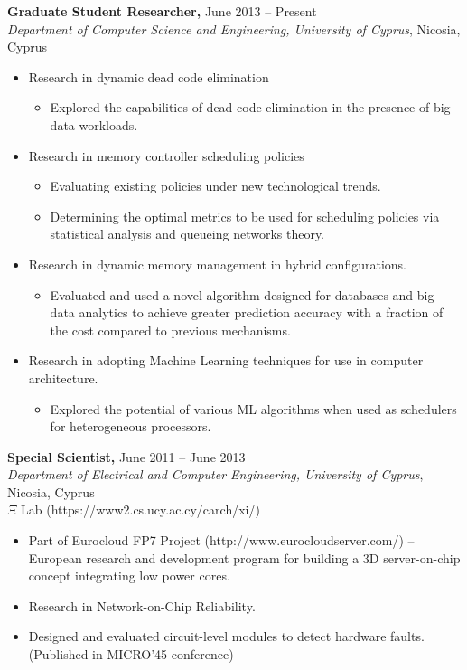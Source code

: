 \documentclass[11pt]{myres} %
\begin{document}
\begin{resume}
{\color{blue}\textbf{Graduate Student Researcher,} June 2013 -- Present} \\
\emph{Department of Computer Science and Engineering, University of Cyprus}, Nicosia, Cyprus \\
\begin{itemize} \itemsep -2pt
    \item Research in dynamic dead code elimination
    \begin{itemize}
    	\item Explored the capabilities of dead code elimination in the presence of big data workloads.
    \end{itemize}
    \item Research in memory controller scheduling policies 
    \begin{itemize}
        \item Evaluating existing policies under new technological trends.
        \item Determining the optimal metrics to be used for scheduling policies via statistical analysis and queueing networks theory.
    \end{itemize}
    \item Research in dynamic memory management in hybrid configurations.
    \begin{itemize}
    	\item Evaluated and used a novel algorithm designed for databases and big data analytics to achieve greater prediction accuracy with a fraction of the cost compared to previous mechanisms.
    \end{itemize}
    \item Research in adopting Machine Learning techniques for use in computer architecture.
    \begin{itemize}
    	\item Explored the potential of various ML algorithms when used as schedulers for heterogeneous processors.
    \end{itemize}
\end{itemize}

{\color{blue}\textbf{Special Scientist,} June 2011 -- June 2013} \\
\emph{Department of Electrical and Computer Engineering, University of Cyprus}, Nicosia, Cyprus \\
$\Xi$ Lab (https://www2.cs.ucy.ac.cy/carch/xi/) \\
\begin{itemize} \itemsep -2pt
	\item Part of Eurocloud FP7 Project (http://www.eurocloudserver.com/) -- European research and development program for building a 3D server-on-chip concept integrating low power cores.
	\item Research in Network-on-Chip Reliability.
	\item Designed and evaluated circuit-level modules to detect hardware faults. (Published in MICRO'45 conference)
\end{itemize}


\end{resume}
\end{document}
